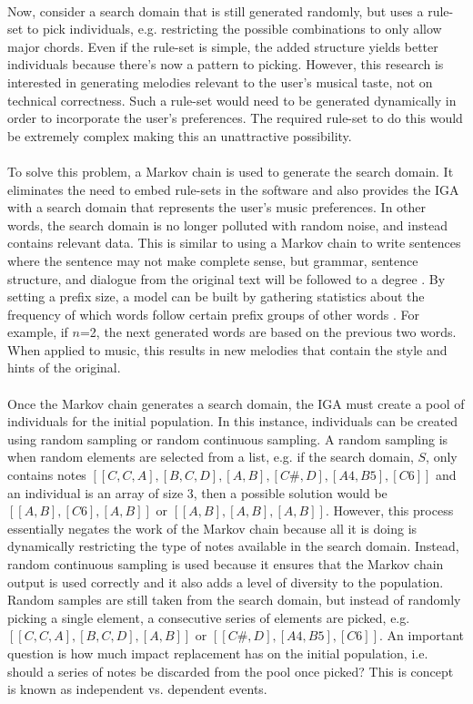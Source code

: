 \documentclass[12pt]{article} %
\begin{document}
\\
Now, consider a search domain that is still generated randomly, but uses a rule-set to pick individuals, e.g. restricting the possible combinations to only allow major chords. Even if the rule-set is simple, the added structure yields better individuals because there's now a pattern to picking. However, this research is interested in generating melodies relevant to the user's musical taste, not on technical correctness. Such a rule-set would need to be generated dynamically in order to incorporate the user's preferences. The required rule-set to do this would be extremely complex making this an unattractive possibility. \\
\\
To solve this problem, a Markov chain is used to generate the search domain. It eliminates the need to embed rule-sets in the software and also provides the IGA with a search domain that represents the user's music preferences. In other words, the search domain is no longer polluted with random noise, and instead contains relevant data. This is similar to using a Markov chain to write sentences where the sentence may not make complete sense, but grammar, sentence structure, and dialogue from the original text will be followed to a degree \cite{website:rose}. By setting a prefix size, a model can be built by gathering statistics about the frequency of which words follow certain prefix groups of other words \cite{website:rose}. For example, if $n$=2, the next generated words are based on the previous two words. When applied to music, this results in new melodies that contain the style and hints of the original. \\
\\

Once the Markov chain generates a search domain, the IGA must create a pool of individuals for the initial population. In this instance, individuals can be created using random sampling or random continuous sampling. A random sampling is when random elements are selected from a list, e.g. if the search domain, $S$, only contains notes $[[C, C, A], [B, C, D], [A, B], [C\#, D], [A4, B5], [C6]]$ and an individual is an array of size 3, then a possible solution would be $[[A,  B], [C6], [A, B]]$ or $[[A, B], [A, B], [A, B]]$. However, this process essentially negates the work of the Markov chain because all it is doing is dynamically restricting the type of notes available in the search domain. Instead, random continuous sampling is used because it ensures that the Markov chain output is used correctly and it also adds a level of diversity to the population. Random samples are still taken from the search domain, but instead of randomly picking a single element, a consecutive series of elements are picked, e.g. $[[C, C, A], [B, C, D], [A, B]]$ or $[[C\#, D], [A4, B5], [C6]]$. An important question is how much impact replacement has on the initial population, i.e. should a series of notes be discarded from the pool once picked? This is concept is known as independent vs. dependent events.
\end{document}
